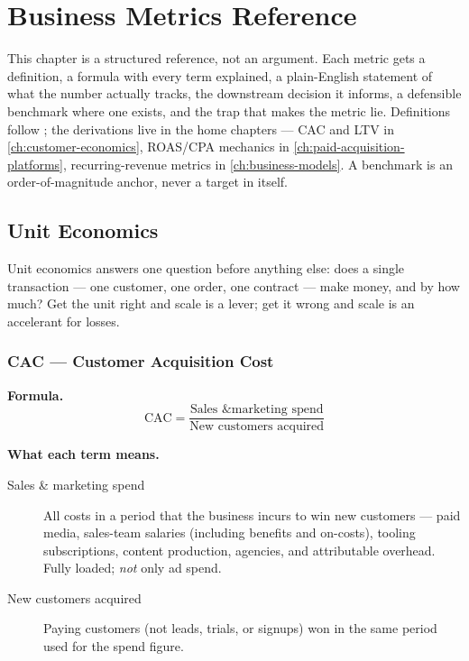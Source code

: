\chapter{Business Metrics Reference}\label{ch:metrics-catalog}


This chapter is a structured reference, not an argument. Each metric gets a definition, a
formula with every term explained, a plain-English statement of what the number actually
tracks, the downstream decision it informs, a defensible benchmark where one exists, and the
trap that makes the metric lie. Definitions follow \textcite{bendle2020marketing}; the
derivations live in the home chapters --- CAC and LTV in \cref{ch:customer-economics},
ROAS/CPA mechanics in \cref{ch:paid-acquisition-platforms}, recurring-revenue metrics in
\cref{ch:business-models}. A benchmark is an order-of-magnitude anchor, never a target in
itself.


\section{Unit Economics}

Unit economics answers one question before anything else: does a single transaction --- one
customer, one order, one contract --- make money, and by how much? Get the unit right and
scale is a lever; get it wrong and scale is an accelerant for losses.

\subsection{CAC --- Customer Acquisition Cost}

\textbf{Formula.}
\[
  \mathrm{CAC} = \frac{\text{Sales \& marketing spend}}{\text{New customers acquired}}
\]

\textbf{What each term means.}
\begin{description}
  \item[Sales \& marketing spend] All costs in a period that the business incurs to win new
    customers --- paid media, sales-team salaries (including benefits and on-costs),
    tooling subscriptions, content production, agencies, and attributable overhead. Fully
    loaded; \emph{not} only ad spend.
  \item[New customers acquired] Paying customers (not leads, trials, or signups) won in the
    same period used for the spend figure.
\end{description}

